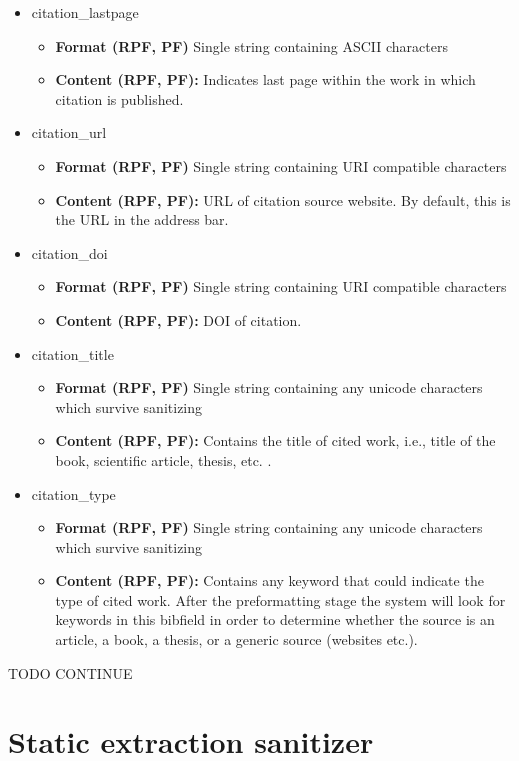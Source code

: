 \documentclass[
a4paper,
12pt,
]
{article}
\begin{document}
\begin{itemize}
   \item citation\_lastpage \begin{itemize} \item \textbf{Format (RPF, PF)} Single string containing ASCII characters \item \textbf{Content (RPF, PF):} Indicates last page within the work in which citation is published. \end{itemize}
   \item citation\_url \begin{itemize} \item \textbf{Format (RPF, PF)} Single string containing URI compatible characters \item \textbf{Content (RPF, PF):} URL of citation source website. By default, this is the URL in the address bar. \end{itemize}
   \item citation\_doi \begin{itemize} \item \textbf{Format (RPF, PF)} Single string containing URI compatible characters \item \textbf{Content (RPF, PF):} DOI of citation. \end{itemize}
   \item citation\_title \begin{itemize} \item \textbf{Format (RPF, PF)} Single string containing any unicode characters which survive sanitizing \item \textbf{Content (RPF, PF):} Contains the title of cited work, i.e., title of the book, scientific article, thesis, etc. . \end{itemize}
  \item citation\_type \begin{itemize} \item \textbf{Format (RPF, PF)} Single string containing any unicode characters which survive sanitizing \item \textbf{Content (RPF, PF):} Contains any keyword that could indicate the type of cited work. After the preformatting stage the system will look for keywords in this bibfield in order to determine whether the source is an article, a book, a thesis, or a generic source (websites etc.). \end{itemize}
 \end{itemize}

 TODO CONTINUE
 
 \section{Static extraction sanitizer}\label{app_sanitize}
 
\end{document}
